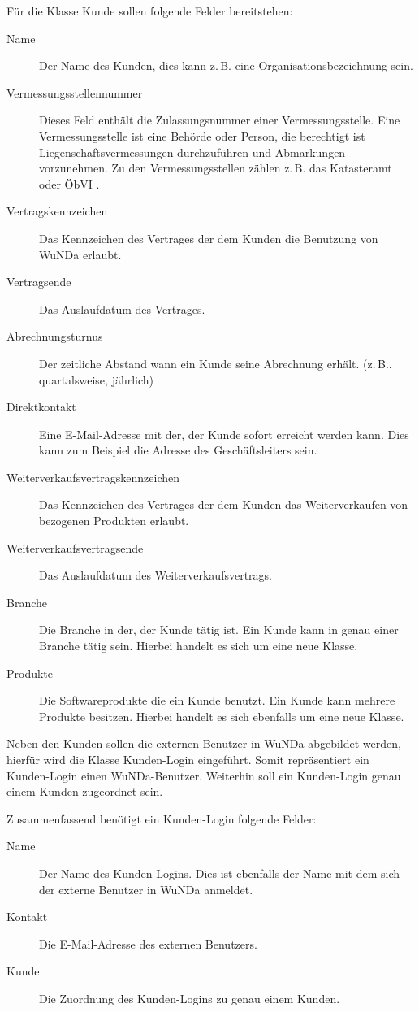 Für die Klasse Kunde sollen folgende Felder bereitstehen:
\begin{description}
\item[Name] Der Name des Kunden, dies kann z.\,B. eine Organisationsbezeichnung sein.
\item[Vermessungsstellennummer] Dieses Feld enthält die Zulassungsnummer einer Vermessungsstelle. Eine Vermessungsstelle ist eine Behörde oder Person, die berechtigt ist Liegenschaftsvermessungen durchzuführen und Abmarkungen vorzunehmen. Zu den Vermessungsstellen zählen z.\,B. das Katasteramt oder ÖbVI \autocite[vgl.][]{recklinghausen-vermessungsstelle}.
\item[Vertragskennzeichen] Das Kennzeichen des Vertrages der dem Kunden die Benutzung von \ac{WuNDa} erlaubt.
\item[Vertragsende] Das Auslaufdatum des Vertrages.
\item[Abrechnungsturnus] Der zeitliche Abstand wann ein Kunde seine Abrechnung erhält. (z.\,B.. quartalsweise, jährlich)
\item[Direktkontakt] Eine E-Mail-Adresse mit der, der Kunde sofort erreicht werden kann. Dies kann zum Beispiel die Adresse des Geschäftsleiters sein.
\item[Weiterverkaufsvertragskennzeichen] Das Kennzeichen des Vertrages der dem Kunden das Weiterverkaufen von bezogenen Produkten erlaubt.
\item[Weiterverkaufsvertragsende] Das Auslaufdatum des Weiterverkaufsvertrags.
\item[Branche] Die Branche in der, der Kunde tätig ist. Ein Kunde kann in genau einer Branche tätig sein. Hierbei handelt es sich um eine neue Klasse.
\item[Produkte] Die Softwareprodukte die ein Kunde benutzt. Ein Kunde kann mehrere Produkte besitzen. Hierbei handelt es sich ebenfalls um eine neue Klasse.
\end{description}

Neben den Kunden sollen die externen Benutzer in \ac{WuNDa} abgebildet werden, hierfür wird die Klasse Kunden-Login eingeführt.
Somit repräsentiert ein Kunden-Login einen \ac{WuNDa}-Benutzer.
Weiterhin soll ein Kunden-Login genau einem Kunden zugeordnet sein. 

Zusammenfassend benötigt ein Kunden-Login folgende Felder:
\begin{description}
\item[Name] Der Name des Kunden-Logins. Dies ist ebenfalls der Name mit dem sich der externe Benutzer in \ac{WuNDa} anmeldet.
\item[Kontakt] Die E-Mail-Adresse des externen Benutzers.
\item[Kunde] Die Zuordnung des Kunden-Logins zu genau einem Kunden.
\end{description}

